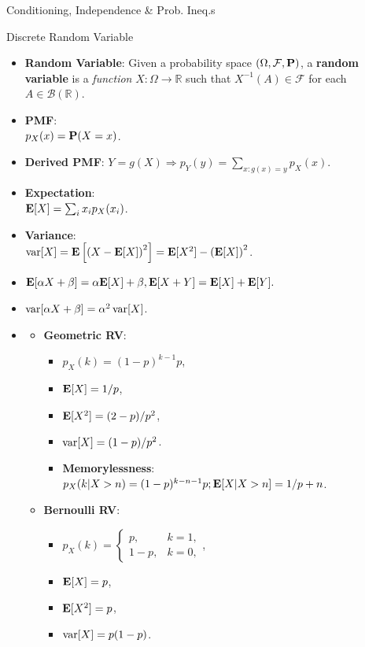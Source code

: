 \documentclass[landscape,a4paper]{article}
\begin{document}
\begin{cheatsheetcolumns}
\begin{card}{Conditioning, Independence \& Prob. Ineq.s}
\begin{itemize}
			\end{itemize}
		\end{card}
		\begin{card}{Discrete Random Variable}
			\begin{itemize}
				\item \textbf{Random Variable}: Given a probability space $(\Omega,\mathcal F,\mathbf{P})$, a \textbf{random variable} is a \textit{function} $X\colon \Omega\to \mathbb R$ such that $X^{-1}(A)\in\mathcal F$ for each $A\in\mathcal B(\mathbb R)$.
				\item \textbf{PMF}:\\ $p_X(x)=\mathbf{P}(X=x)$.
				\item \textbf{Derived PMF}: $Y=g(X)\Rightarrow p_Y(y)=\sum_{x:g(x)=y}p_X(x)$.
				\item \textbf{Expectation}:\\ $\mathbf{E}[X]=\sum_ix_ip_X(x_i)$.
				\item \textbf{Variance}:\\ $\operatorname{var}[X]=\mathbf{E}\left[\left(X-\mathbf{E}[X]\right)^2\right]=\mathbf{E}[X^2]-\left(\mathbf{E}[X]\right)^2$.
				\item $\mathbf{E}[\alpha X+ \beta]=\alpha\mathbf{E}[X]+\beta,\mathbf{E}[X+Y]=\mathbf{E}[X]+\mathbf{E}[Y].$
				\item $\operatorname{var}[\alpha X+\beta]=\alpha^2\operatorname{var}[X]$.
				\item \begin{itemize}
					\item \textbf{Geometric RV}:
					\begin{itemize}
						\item $p_X(k)=(1-p)^{k-1}p$,
						\item $\mathbf{E}[X]=1/p$,
						\item $\mathbf{E}[X^2]=(2-p)/p^2$,
						\item $\operatorname{var}[X]=(1-p)/p^2$.
						\item \textbf{Memorylessness}:\\ $p_X(k|X>n)=(1-p)^{k-n-1}p;\mathbf{E}[X|X > n]=1/p + n$.
					\end{itemize}
					\item \textbf{Bernoulli RV}:
					\begin{itemize}
						\item $p_X(k)=\begin{cases}p,&k=1,\\1-p,&k=0,\end{cases}$,
						\item $\mathbf{E}[X]=p$,
						\item $\mathbf{E}[X^2]=p$,
						\item $\operatorname{var}[X]=p(1-p)$.

\end{itemize}
\end{itemize}
\end{itemize}
\end{card}
\end{cheatsheetcolumns}
\end{document}

